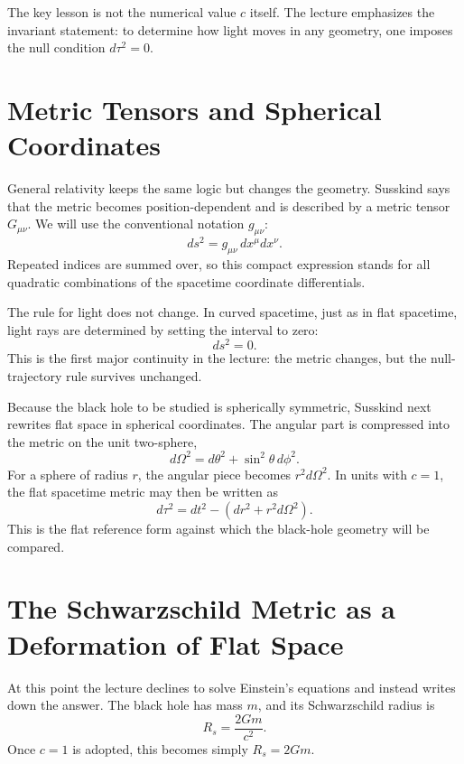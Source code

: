 The key lesson is not the numerical value \(c\) itself. The lecture emphasizes the invariant statement: to determine how light moves in any geometry, one imposes the null condition \(d\tau^2=0\).

\section{Metric Tensors and Spherical Coordinates}

General relativity keeps the same logic but changes the geometry. Susskind says that the metric becomes position-dependent and is described by a metric tensor \(G_{\mu\nu}\). We will use the conventional notation \(g_{\mu\nu}\):
\begin{equation}
ds^2 = g_{\mu\nu}\,dx^\mu dx^\nu.
\end{equation}
Repeated indices are summed over, so this compact expression stands for all quadratic combinations of the spacetime coordinate differentials.

The rule for light does not change. In curved spacetime, just as in flat spacetime, light rays are determined by setting the interval to zero:
\begin{equation}
ds^2=0.
\end{equation}
This is the first major continuity in the lecture: the metric changes, but the null-trajectory rule survives unchanged.

Because the black hole to be studied is spherically symmetric, Susskind next rewrites flat space in spherical coordinates. The angular part is compressed into the metric on the unit two-sphere,
\begin{equation}
d\Omega^2 = d\theta^2 + \sin^2\theta\,d\phi^2.
\end{equation}
For a sphere of radius \(r\), the angular piece becomes \(r^2d\Omega^2\). In units with \(c=1\), the flat spacetime metric may then be written as
\begin{equation}
d\tau^2 = dt^2 - \left(dr^2 + r^2 d\Omega^2\right).
\end{equation}
This is the flat reference form against which the black-hole geometry will be compared.

\section{The Schwarzschild Metric as a Deformation of Flat Space}

At this point the lecture declines to solve Einstein's equations and instead writes down the answer. The black hole has mass \(m\), and its Schwarzschild radius is
\begin{equation}
R_s=\frac{2Gm}{c^2}.
\end{equation}
Once \(c=1\) is adopted, this becomes simply \(R_s=2Gm\).

